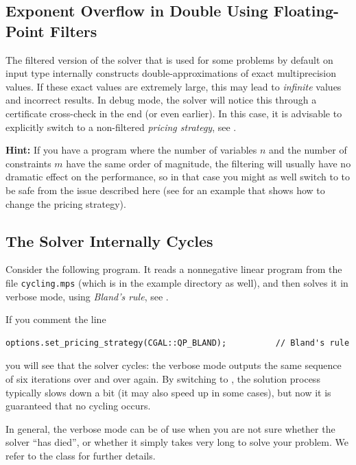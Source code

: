 \subsection{Exponent Overflow in Double Using Floating-Point Filters\label{sec:QP-customization-filtering}}
The filtered version of the solver that is used for some problems
by default on input
type  internally constructs double-approximations of exact
multiprecision values. If these exact values are extremely large, this
may lead to \emph{infinite}  values and incorrect results.
In debug mode, the solver will notice this through a certificate 
cross-check in the end (or even earlier). In this case, it is advisable
to explicitly switch to a non-filtered \emph{pricing strategy}, see
.

{\bf Hint:} 
If you have a program where the number of variables $n$ and the number of
constraints $m$ have the same order of 
magnitude, the filtering will usually have
no dramatic effect on the performance, so in that case you might as well 
switch to  
to be safe from the issue described here (see 
for an example that shows how to change the pricing strategy).

\subsection{The Solver Internally Cycles\label{sec:QP-customization-cycling}}
Consider the following program. It reads a nonnegative linear program from 
the file \texttt{cycling.mps} (which is in the example directory as well),
and then solves it in verbose mode, using \emph{Bland's rule}, see
.


If you comment the line 
\begin{verbatim}
options.set_pricing_strategy(CGAL::QP_BLAND);          // Bland's rule
\end{verbatim}
you will see that the solver cycles: the verbose mode outputs the same
sequence of six iterations over and over again. By switching to 
, the solution process typically slows down a bit 
(it may also speed up in some cases), but now it is guaranteed that
no cycling occurs.

In general, the verbose mode can be of use when you are not sure whether 
the solver ``has died'', or whether it simply takes very long to solve
your problem.  We refer to the class 
for further details.

